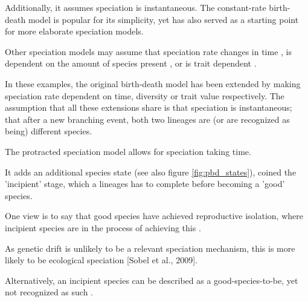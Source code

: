 Additionally, it assumes speciation is instantaneous.
The constant-rate birth-death model is popular for its simplicity, yet
has also served as a starting point for more elaborate speciation models.


Other speciation models may assume that speciation rate changes in 
time \cite{rabosky2008explosive}, is dependent on the amount of species 
present \cite{etienne2011diversity}, or is trait 
dependent \cite{fitzjohn2009estimating}.

In these examples, the original birth-death model has been extended by making 
speciation rate dependent on time, diversity or trait value respectively.
The assumption that all these extensions share is that speciation is instantaneous;
that after a new branching event, both two lineages are (or are recognized as being) different
species.



The protracted speciation model \cite{etienne2012prolonging} allows for speciation taking time.

It adds an additional species state (see also figure \ref{fig:pbd_states}),
coined the 'incipient' stage, which a lineages has to complete before becoming
a 'good' species.

One view is to say that good species have achieved reproductive isolation,
where incipient species are in the process of achieving this .

As genetic drift is unlikely to be a relevant speciation mechanism,
this is more likely to be ecological speciation [Sobel et al., 2009]. 

Alternatively, an incipient species can be described as a good-species-to-be,
yet not recognized as such .

